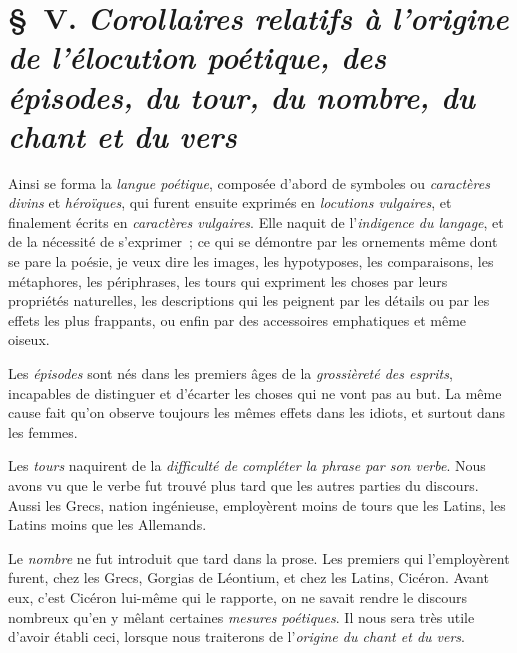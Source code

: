 \documentclass[french,twoside]{book} %
\begin{document}
\section[{§ V. Corollaires relatifs à l’origine de l’élocution poétique, des épisodes, du tour, du nombre, du chant et du vers}]{§ V. {\itshape Corollaires relatifs à l’origine de l’élocution poétique, des épisodes, du tour, du nombre, du chant et du vers}}
\noindent Ainsi se forma la {\itshape langue poétique}, composée d’abord de symboles ou {\itshape caractères divins} et {\itshape héroïques}, qui furent ensuite exprimés en {\itshape locutions vulgaires},  et finalement écrits en {\itshape caractères vulgaires}. Elle naquit de l’{\itshape indigence du langage}, et de la nécessité de s’exprimer ; ce qui se démontre par les ornements même dont se pare la poésie, je veux dire les images, les hypotyposes, les comparaisons, les métaphores, les périphrases, les tours qui expriment les choses par leurs propriétés naturelles, les descriptions qui les peignent par les détails ou par les effets les plus frappants, ou enfin par des accessoires emphatiques et même oiseux.\par
Les {\itshape épisodes} sont nés dans les premiers âges de la {\itshape grossièreté des esprits}, incapables de distinguer et d’écarter les choses qui ne vont pas au but. La même cause fait qu’on observe toujours les mêmes effets dans les idiots, et surtout dans les femmes.\par
Les {\itshape tours} naquirent de la {\itshape difficulté de compléter la phrase par son verbe}. Nous avons vu que le verbe fut trouvé plus tard que les autres parties du discours. Aussi les Grecs, nation ingénieuse, employèrent moins de tours que les Latins, les Latins moins que les Allemands.\par
Le {\itshape nombre} ne fut introduit que tard dans la prose. Les premiers qui l’employèrent furent, chez les Grecs, Gorgias de Léontium, et chez les Latins, Cicéron. Avant eux, c’est Cicéron lui-même qui le rapporte, on ne savait rendre le discours nombreux qu’en y mêlant certaines {\itshape mesures poétiques}. Il nous sera très utile d’avoir établi ceci, lorsque nous traiterons de l’{\itshape origine du chant et du vers}.\par
\end{document}

